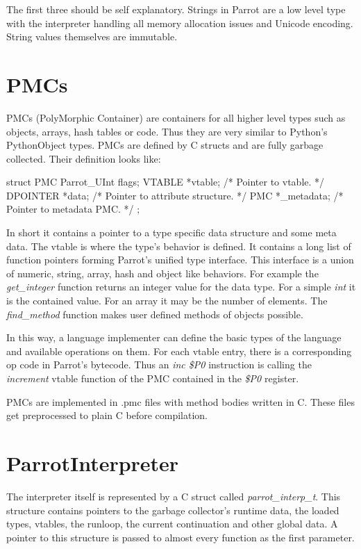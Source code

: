 \documentclass[bachelor,english]{hgbthesis}
\begin{document}
The first three should be self explanatory. Strings in Parrot are a low level type with the interpreter handling all memory allocation issues and Unicode encoding. String values themselves are immutable.

\section{PMCs}
\label{sec:PMCs}

PMCs (PolyMorphic Container) are containers for all higher level types such as objects, arrays, hash tables or code. Thus they are very similar to Python's PythonObject types. PMCs are defined by C structs and are fully garbage collected. Their definition looks like:
\begin{CCode}
struct PMC {
    Parrot_UInt    flags;
    VTABLE         *vtable;             /* Pointer to vtable. */
    DPOINTER       *data;               /* Pointer to attribute structure. */
    PMC            *_metadata;          /* Pointer to metadata PMC. */
};
\end{CCode}
In short it contains a pointer to a type specific data structure and some meta data. The vtable is where the type's behavior is defined. It contains a long list of function pointers forming Parrot's unified type interface. This interface is a union of numeric, string, array, hash and object like behaviors. For example the  \textit{get\_integer} function returns an integer value for the data type. For a simple \textit{int} it is the contained value. For an array it may be the number of elements. The \textit{find\_method} function makes user defined methods of objects possible.

In this way, a language implementer can define the basic types of the language and available operations on them. For each vtable entry, there is a corresponding op code in Parrot's bytecode. Thus an \textit{inc \$P0} instruction is calling the \textit{increment} vtable function of the PMC contained in the \textit{\$P0} register.

PMCs are implemented in .pmc files with method bodies written in C. These files get preprocessed to plain C before compilation.

\section{ParrotInterpreter}

The interpreter itself is represented by a C struct called \textit{parrot\_interp\_t}. This structure contains pointers to the garbage collector's runtime data, the loaded types, vtables, the runloop, the current continuation and other global data. A pointer to this structure is passed to almost every function as the first parameter.
\end{document}
